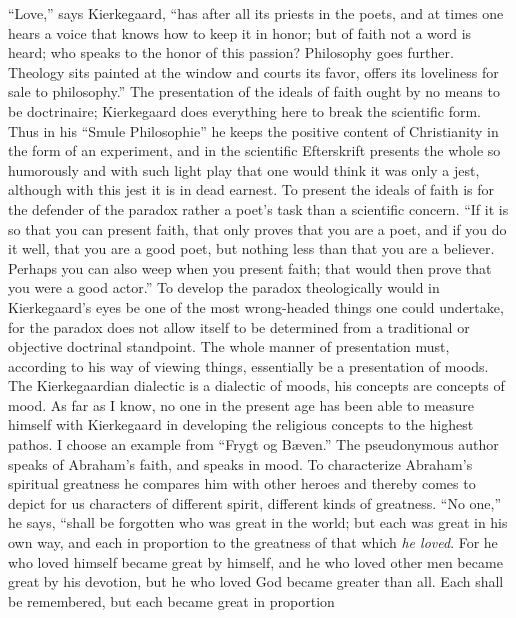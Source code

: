 \documentclass[12pt]{book}
\newcommand{\opage}[1]{\marginnote{\footnotesize\textit{[#1]}}}
\begin{document}
``Love,'' says Kierkegaard, ``has after all its priests in the poets,
and at times one hears a voice that knows how to keep it in honor; but
of faith not a word is heard; who speaks to the honor of this passion?
Philosophy goes further. Theology sits painted at the window and courts
its favor, offers its loveliness for sale to philosophy.'' The
presentation of the ideals of faith ought by no means to be doctrinaire;
Kierkegaard does everything here
\opage{231}\setcounter{footnote}{0}%
to break the scientific form. Thus in his ``Smule Philosophie'' he
keeps the positive content of Christianity in the form of an
experiment, and in the scientific Efterskrift presents the whole so
humorously and with such light play that one would think it was only a
jest, although with this jest it is in dead earnest.
To present the ideals of faith is for the defender of the paradox rather
a poet's task than a scientific concern. ``If it is so that you can
present faith, that only proves that you are a poet, and if you do it
well, that you are a good poet, but nothing less than that you are a
believer. Perhaps you can also weep when you present faith; that would
then prove that you were a good actor.'' To develop the paradox
theologically would in Kierkegaard's eyes be one of the most
wrong-headed things one could undertake, for the paradox does not allow
itself to be determined from a traditional or objective doctrinal
standpoint. The whole manner of presentation must, according to his way
of viewing things, essentially be a presentation of moods. The
Kierkegaardian dialectic is a dialectic of moods, his concepts are
concepts of mood. As far as I know, no one in the present age has been
able to measure himself with Kierkegaard in developing the religious
concepts to the highest pathos. I choose an example from ``Frygt og
Bæven.'' The pseudonymous author speaks of Abraham's faith, and speaks
in mood. To characterize Abraham's spiritual greatness he compares him
with other heroes and thereby comes to depict for us characters of
different spirit, different kinds of greatness. ``No one,'' he says,
``shall be forgotten who was great in the world; but each was great in
his own way, and each in proportion to the greatness of that which
\emph{he loved}. For he who loved himself became great by himself, and
he who loved other men became great by his devotion, but he who loved
God became greater
\opage{232}\setcounter{footnote}{0}%
than all. Each shall be remembered, but each became great in proportion
\end{document}
